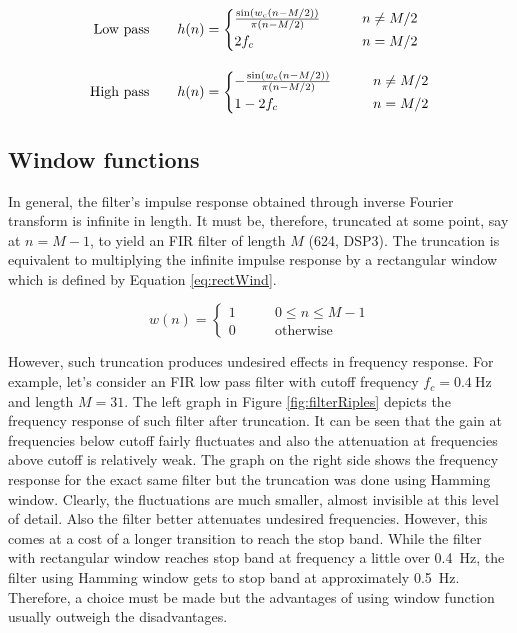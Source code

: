\begin{align}
\text{Low pass\qquad} & h(n) = \begin{cases}
\frac{\sin \left( w_c \left( n - M / 2 \right) \right)}{\pi \left( n - M / 2 \right)} & \qquad n \neq M / 2 \\[0.2em]
2 f_c & \qquad n = M / 2
\end{cases} \label{eq:lowPass}\\[1em]
\text{High pass\qquad} & h(n) = \begin{cases}
-\frac{\sin \left( w_c \left( n - M / 2 \right) \right)}{\pi \left( n - M / 2 \right)} & \qquad n \neq M / 2 \\[0.2em]
1 - 2 f_c & \qquad n = M / 2
\end{cases}\label{eq:highPass}
\end{align}

\subsection{Window functions}
In general, the filter's impulse response obtained through inverse Fourier transform is infinite in length. It must be, therefore, truncated at some point, say at $n = M-1$, to yield an FIR filter of length $M$ (624, DSP3). The truncation is equivalent to multiplying the infinite impulse response by a rectangular window  which is defined by Equation \ref{eq:rectWind}.

\begin{equation}
\label{eq:rectWind}
w(n) = \begin{cases}
1 &\qquad 0 \leq n \leq M-1\\
0 &\qquad \text{otherwise}
\end{cases}
\end{equation}

However, such truncation produces undesired effects in frequency response. For example, let's consider an FIR low pass filter with cutoff frequency $f_c=\SI{0.4}{\Hz}$ and length $M=31$. The left graph in Figure \ref{fig:filterRiples} depicts the frequency response of such filter after truncation. It can be seen that the gain at frequencies below cutoff fairly fluctuates and also the attenuation at frequencies above cutoff is relatively weak. The graph on the right side shows the frequency response for the exact same filter but the truncation was done using Hamming window. Clearly, the fluctuations are much smaller, almost invisible at this level of detail. Also the filter better attenuates undesired frequencies. However, this comes at a cost of a longer transition to reach the stop band. While the filter with rectangular window reaches stop band at frequency a little over \SI{0.4}{\Hz}, the filter using Hamming window gets to stop band at approximately \SI{0.5}{\Hz}. Therefore, a choice must be made but the advantages of using window function usually outweigh the disadvantages.

